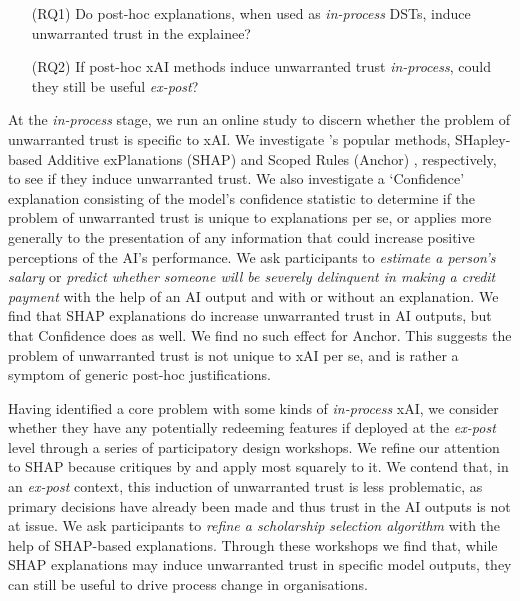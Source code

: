 \begin{enumerate}
    \item[(RQ1)] Do post-hoc explanations, when used as \emph{in-process} DSTs, induce unwarranted trust in the explainee?
    \item[(RQ2)] If post-hoc xAI methods induce unwarranted trust \emph{in-process}, could they still be useful \emph{ex-post}?
\end{enumerate}

At the \emph{in-process} stage, we run an online study to discern whether the problem of unwarranted trust is specific to xAI. We investigate \textcite{lundberg_unified_2017,ribeiro_anchors_2018}'s popular methods, SHapley-based Additive exPlanations (SHAP) \cite{lundberg_unified_2017} and Scoped Rules (Anchor) \cite{ribeiro_anchors_2018}, respectively, to see if they induce unwarranted trust. We also investigate a `Confidence' explanation consisting of the model's confidence statistic to determine if the problem of unwarranted trust is unique to explanations per se, or applies more generally to the presentation of any information that could increase positive perceptions of the AI's performance. We ask participants to \emph{estimate a person's salary} \cite{kohavi_scaling_1996} or \emph{predict whether someone will be severely delinquent in making a credit payment} \cite{GiveMeSomeCredit} with the help of an AI output and with or without an explanation. We find that SHAP explanations do increase unwarranted trust in AI outputs, but that Confidence does as well. We find no such effect for Anchor. This suggests the problem of unwarranted trust is not unique to xAI per se, and is rather a symptom of generic post-hoc justifications.

Having identified a core problem with some kinds of \emph{in-process} xAI, we consider whether they have any potentially redeeming features if deployed at the \emph{ex-post} level through a series of participatory design workshops. We refine our attention to SHAP because critiques by \textcite{Lipton} and \textcite{miller_explainable_2023} apply most squarely to it. We contend that, in an \emph{ex-post} context, this induction of unwarranted trust is less problematic, as primary decisions have already been made and thus trust in the AI outputs is not at issue. We ask participants to \emph{refine a scholarship selection algorithm} with the help of SHAP-based explanations. Through these workshops we find that, while SHAP explanations may induce unwarranted trust in specific model outputs, they can still be useful to drive process change in organisations.

